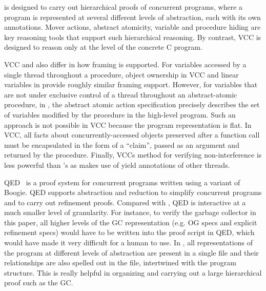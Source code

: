 \civl is designed to carry out hierarchical proofs of concurrent programs, where a program is represented at several different levels of abstraction, each with its own annotations.
Mover actions, abstract atomicity, variable and procedure hiding are key reasoning tools that support such hierarchical reasoning. By contrast, VCC is designed to reason only at the level of the concrete C program. 

VCC and \civl also differ in how framing is supported. For variables accessed by a single thread throughout a procedure, object ownership in VCC and linear variables in \civl provide roughly similar framing support. However, for variables that are not under exclusive control of a thread throughout an abstract-atomic procedure, in \civl, the abstract atomic action specification precisely describes the set of variables modified by the procedure in the high-level program. Such an approach is not possible in VCC because the program representation is flat. 
In VCC, all facts about concurrently-accessed objects preserved after a function call must be encapsulated in the form of a ``claim'', passed as an argument and returned by the procedure. Finally, VCCs method for verifying non-interference is less powerful than \civl's as \civl makes use of yield annotations of other threads. 

QED~\cite{QED} is a proof system for concurrent programs written using a variant of Boogie. QED supports abstraction and reduction to simplify concurrent programs and to carry out refinement proofs. Compared with \civl, QED is interactive at a much smaller level of granularity. For instance, to verify the garbage collector in this paper, all higher levels of the GC representation (e.g. OG specs and explicit refinement specs) would have to be written into the proof script in QED, which would have made it very difficult for a human to use. In \civl, all representations of the program at different levels of abstraction are present in a single file and their relationships are also spelled out in the file, intertwined with the program structure. This is really helpful in organizing and carrying out a large hierarchical proof such as the GC.
 

